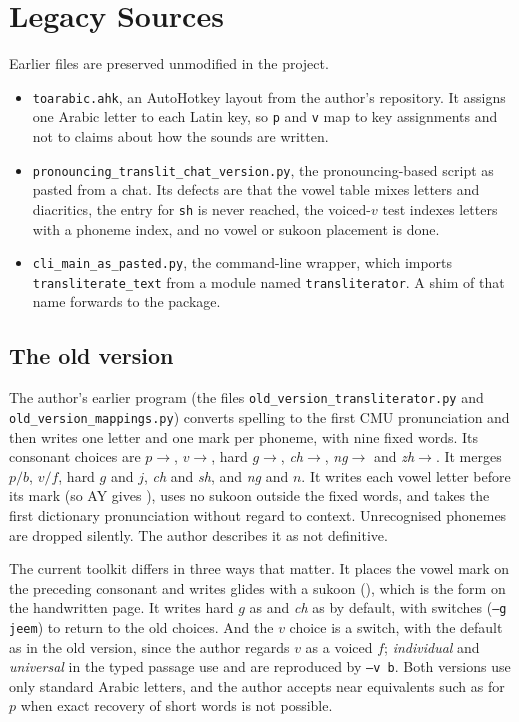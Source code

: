 \chapter{Legacy Sources}\label{app:legacy}
Earlier files are preserved unmodified in the project.

\begin{itemize}
\item \texttt{toarabic.ahk}, an AutoHotkey layout from the author's repository. It assigns one Arabic letter to each Latin key, so \texttt{p} and \texttt{v} map to key assignments and not to claims about how the sounds are written.
\item \texttt{pronouncing\_translit\_chat\_version.py}, the pronouncing-based script as pasted from a chat. Its defects are that the vowel table mixes letters and diacritics, the entry for \texttt{sh} is never reached, the voiced-$v$ test indexes letters with a phoneme index, and no vowel or sukoon placement is done.
\item \texttt{cli\_main\_as\_pasted.py}, the command-line wrapper, which imports \texttt{transliterate\_text} from a module named \texttt{transliterator}. A shim of that name forwards to the package.
\end{itemize}

\section{The old version}
The author's earlier program (the files \texttt{old\_version\_}\allowbreak\texttt{transliterator.py} and \texttt{old\_version\_}\allowbreak\texttt{mappings.py}) converts spelling to the first CMU pronunciation and then writes one letter and one mark per phoneme, with nine fixed words. Its consonant choices are $p\to$, $v\to$, hard $g\to$, \emph{ch}$\to$, \emph{ng}$\to$ and \emph{zh}$\to$. It merges $p/b$, $v/f$, hard $g$ and $j$, \emph{ch} and \emph{sh}, and \emph{ng} and $n$. It writes each vowel letter before its mark (so AY gives ), uses no sukoon outside the fixed words, and takes the first dictionary pronunciation without regard to context. Unrecognised phonemes are dropped silently. The author describes it as not definitive.

The current toolkit differs in three ways that matter. It places the vowel mark on the preceding consonant and writes glides with a sukoon (), which is the form on the handwritten page. It writes hard $g$ as  and \emph{ch} as  by default, with switches (\texttt{--g jeem}) to return to the old choices. And the $v$ choice is a switch, with  the default as in the old version, since the author regards $v$ as a voiced $f$; \emph{individual} and \emph{universal} in the typed passage use  and are reproduced by \texttt{--v b}. Both versions use only standard Arabic letters, and the author accepts near equivalents such as  for $p$ when exact recovery of short words is not possible.
